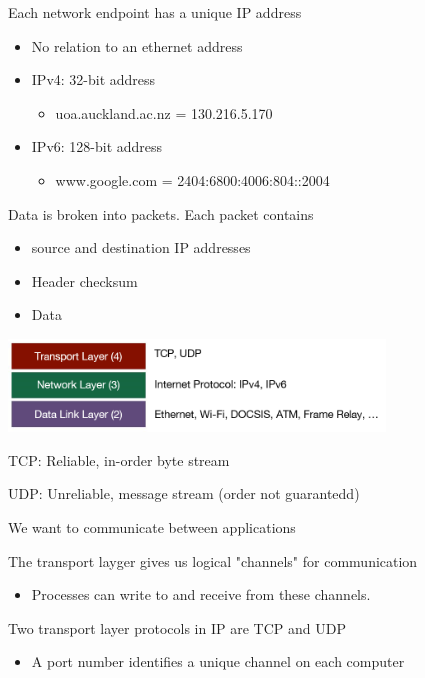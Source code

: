 \begin{slide}

	
	Each network endpoint has a unique IP address
	\begin{itemize}
		\item No relation to an ethernet address
		\item IPv4: 32-bit address
			\begin{itemize}
				\item uoa.auckland.ac.nz = 130.216.5.170
			\end{itemize}
		\item IPv6: 128-bit address
			\begin{itemize}
				\item www.google.com = 2404:6800:4006:804::2004
			\end{itemize}
	\end{itemize}
	\bigskip
	
	Data is broken into packets. Each packet contains
	\begin{itemize}
		\item source and destination IP addresses
		\item Header checksum
		\item Data
	\end{itemize}

\end{slide}

\begin{slide}

	
	\includegraphics[width=100mm]{comm-over-ip.png}
	\bigskip
	
	TCP: Reliable, in-order byte stream
	\bigskip
	
	UDP: Unreliable, message stream (order not guarantedd)
	
\end{slide}

\begin{slide}

	
	We want to communicate between applications
	\bigskip
	
	The transport layger gives us logical "channels" for communication
	\begin{itemize}
		\item Processes can write to and receive from these channels.
	\end{itemize}
	\bigskip
	
	Two transport layer protocols in IP are TCP and UDP
	\begin{itemize}
		\item A port number identifies a unique channel on each computer
	\end{itemize}

\end{slide}

